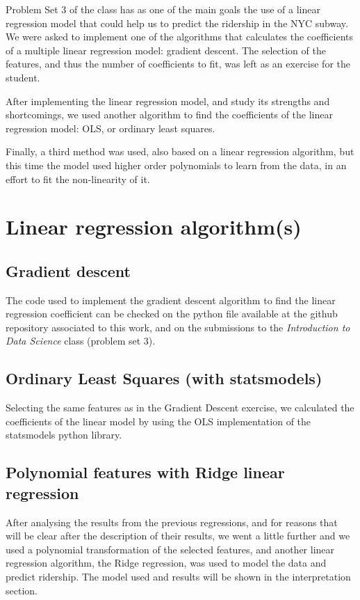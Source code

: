 \documentclass[a4paper,12pt,english]{sphinxmanual}
\begin{document}
Problem Set 3 of the class has as one of the main goals the use of a linear
regression model that could help us to predict the ridership in the NYC subway.
We were asked to implement one of the algorithms that calculates the coefficients
of a multiple linear regression model: gradient descent. The selection of the
features, and thus the number of coefficients to fit, was left as an exercise
for the student.

After implementing the linear regression model, and study its strengths and
shortcomings, we used another algorithm to find the coefficients of the linear
regression model: OLS, or ordinary least squares.

Finally, a third method was used, also based on a linear regression algorithm,
but this time the model used higher order polynomials to learn from the data,
in an effort to fit the non-linearity of it.


\section{Linear regression algorithm(s)}
\label{section2:linear-regression-algorithm-s}

\subsection{Gradient descent}
\label{section2:gradient-descent}
The code used to implement the gradient descent algorithm to find the linear
regression coefficient can be checked on the python file available at the
github repository associated to this work, and on the submissions to the
\emph{Introduction to Data Science} class (problem set 3).


\subsection{Ordinary Least Squares (with statsmodels)}
\label{section2:ordinary-least-squares-with-statsmodels}
Selecting the same features as in the Gradient Descent exercise, we calculated
the coefficients of the linear model by using the OLS implementation of the
statsmodels python library.


\subsection{Polynomial features with Ridge linear regression}
\label{section2:polynomial-features-with-ridge-linear-regression}
After analysing the results from the previous regressions, and for reasons that
will be clear after the description of their results, we went a little further
and we used a polynomial transformation of the selected features, and another
linear regression algorithm, the Ridge regression, was used to model the data
and predict ridership. The model used and results will be shown in the
interpretation section.
\end{document}
